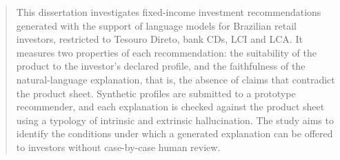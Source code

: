 
\begin{abstract}
This dissertation investigates fixed-income investment recommendations
generated with the support of language models for Brazilian retail investors,
restricted to Tesouro Direto, bank CDs, LCI and LCA. It measures two properties
of each recommendation: the suitability of the product to the investor's
declared profile, and the faithfulness of the natural-language explanation,
that is, the absence of claims that contradict the product sheet. Synthetic
profiles are submitted to a prototype recommender, and each explanation is
checked against the product sheet using a typology of intrinsic and extrinsic
hallucination. The study aims to identify the conditions under which a
generated explanation can be offered to investors without case-by-case human
review.
\end{abstract}
